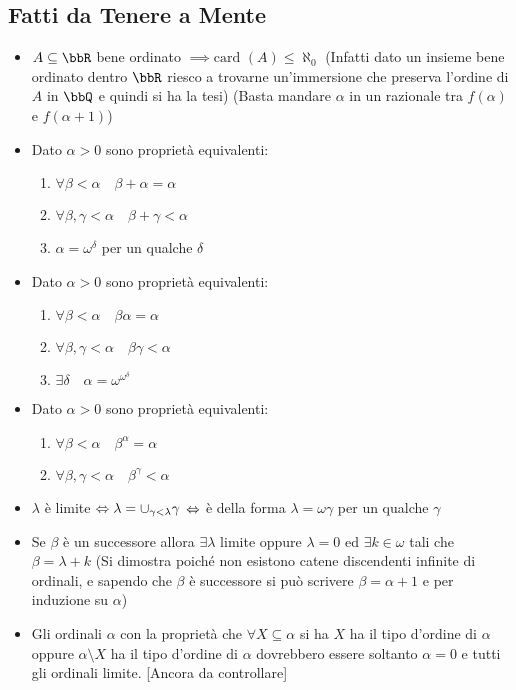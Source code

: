 \documentclass[a4paper,NoNotes,GeneralMath]{stdmdoc}
\newcommand{\card}[1]{\text{card }({#1})}
\begin{document}
	\subsection*{Fatti da Tenere a Mente}
	\begin{itemize}
		\item $A \subseteq \bbR$ bene ordinato $\implies \card{A} \le \aleph_0$ (Infatti dato un insieme bene ordinato dentro $\bbR$ riesco a trovarne un'immersione che preserva l'ordine di $A$ in $\bbQ$ e quindi si ha la tesi) (Basta mandare $\alpha$ in un razionale tra $f(\alpha)$ e $f(\alpha + 1)$)
		\item Dato $\alpha > 0$ sono proprietà equivalenti:
			\begin{enumerate}
				\item $\forall \beta < \alpha \quad \beta + \alpha = \alpha$
				\item $\forall \beta, \gamma < \alpha \quad \beta + \gamma < \alpha$
				\item $\alpha = \omega ^ \delta$ per un qualche $\delta$
			\end{enumerate}
		\item Dato $\alpha > 0$ sono proprietà equivalenti:
			\begin{enumerate}
				\item $\forall \beta < \alpha \quad \beta \alpha = \alpha$
				\item $\forall \beta, \gamma < \alpha \quad \beta \gamma < \alpha$
				\item $\exists \delta \quad \alpha = \omega^{\omega^\delta}$
			\end{enumerate}
		\item Dato $\alpha > 0$ sono proprietà equivalenti:
			\begin{enumerate}
				\item $\forall \beta < \alpha \quad \beta^\alpha = \alpha$
				\item $\forall \beta, \gamma < \alpha \quad \beta^\gamma < \alpha$
			\end{enumerate}
		\item $\lambda$ è limite $\Leftrightarrow \lambda = \cup_{\gamma < \lambda} \gamma$ $\Leftrightarrow$ è della forma $\lambda = \omega \gamma$ per un qualche $\gamma$
		\item Se $\beta$ è un successore allora $\exists \lambda$ limite oppure $\lambda = 0$ ed $\exists k \in \omega$ tali che $\beta = \lambda + k$ (Si dimostra poiché non esistono catene discendenti infinite di ordinali, e sapendo che $\beta$ è successore si può scrivere $\beta = \alpha + 1$ e per induzione su $\alpha$)
		\item Gli ordinali $\alpha$ con la proprietà che $\forall X \subseteq \alpha$ si ha $X$ ha il tipo d'ordine di $\alpha$ oppure $\alpha \setminus X$ ha il tipo d'ordine di $\alpha$ dovrebbero essere soltanto $\alpha = 0$ e tutti gli ordinali limite. [Ancora da controllare]
	\end{itemize}
	
\end{document}
